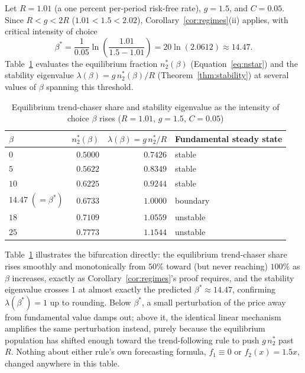 \documentclass[11pt]{article}
\theoremstyle{remark}
\theoremstyle{definition}
\begin{document}
Let $R=1.01$ (a one percent per-period risk-free rate), $g=1.5$, and $C=0.05$. Since $R<g<2R$ ($1.01<1.5<2.02$), Corollary~\ref{cor:regimes}(ii) applies, with critical intensity of choice
\begin{equation*}
\beta^{*} = \frac{1}{0.05}\ln\!\left(\frac{1.01}{1.5-1.01}\right) = 20\ln(2.0612) \approx 14.47.
\end{equation*}
Table~\ref{tab:brockhommes} evaluates the equilibrium fraction $n_2^{*}(\beta)$ (Equation~\eqref{eq:nstar}) and the stability eigenvalue $\lambda(\beta)=g\,n_2^{*}(\beta)/R$ (Theorem~\ref{thm:stability}) at several values of $\beta$ spanning this threshold.

\begin{table}[htbp]
\centering
\caption{Equilibrium trend-chaser share and stability eigenvalue as the intensity of choice $\beta$ rises ($R=1.01$, $g=1.5$, $C=0.05$)}
\label{tab:brockhommes}
\begin{tabular}{@{}lrrl@{}}
\toprule
$\beta$ & $n_2^{*}(\beta)$ & $\lambda(\beta)=g\,n_2^{*}/R$ & Fundamental steady state \\
\midrule
$0$ & $0.5000$ & $0.7426$ & stable \\
$5$ & $0.5622$ & $0.8349$ & stable \\
$10$ & $0.6225$ & $0.9244$ & stable \\
$14.47\;(=\beta^{*})$ & $0.6733$ & $1.0000$ & boundary \\
$18$ & $0.7109$ & $1.0559$ & unstable \\
$25$ & $0.7773$ & $1.1544$ & unstable \\
\bottomrule
\end{tabular}
\end{table}

Table~\ref{tab:brockhommes} illustrates the bifurcation directly: the equilibrium trend-chaser share rises smoothly and monotonically from $50\%$ toward (but never reaching) $100\%$ as $\beta$ increases, exactly as Corollary~\ref{cor:regimes}'s proof requires, and the stability eigenvalue crosses $1$ at almost exactly the predicted $\beta^{*}\approx14.47$, confirming $\lambda(\beta^{*})=1$ up to rounding. Below $\beta^{*}$, a small perturbation of the price away from fundamental value damps out; above it, the identical linear mechanism amplifies the same perturbation instead, purely because the equilibrium population has shifted enough toward the trend-following rule to push $g\,n_2^{*}$ past $R$. Nothing about either rule's own forecasting formula, $f_1\equiv0$ or $f_2(x)=1.5x$, changed anywhere in this table.
\end{document}
